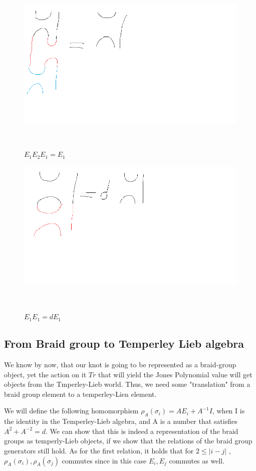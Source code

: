\documentclass{article}
\begin{document}
\begin{figure}
\includegraphics[scale=0.5]{tempely_lieb_second_rule} 
\caption{$E_{1}E_{2}E_{1}=E_{1}$}\
\end{figure}

\begin{figure}
\includegraphics[scale=0.5]{tempely_lieb_third_rule} 
\caption{$E_{1}E_{1}=dE_{1}$}\
\end{figure}

\subsection{From Braid group to Temperley Lieb algebra}
We know by now, that our knot is going to be represented as a braid-group object, yet the action on it $Tr$ that will yield the Jones Polynomial value will get objects from the Tmperley-Lieb world. Thus, we need some "translation" from a braid group element to a temperley-Lien element. 

We will define the following homomorphism
$\rho_{A}(\sigma_{i}) = AE_{i} +A^{-1}I$, when I is the identity in the Temperley-Lieb algebra,
and A is a number that satisfies $A^{2}+A^{-2}=d$.
We can show that this is indeed a representation of the braid groups as temperly-Lieb objects, if we show that the relations
of the braid group generators still hold.
As for the first relation, it holds that for $2 \leq |i-j|$ , $\rho_{A}(\sigma_{i}),\rho_{A}(\sigma_{j})$ commutes since in this case $E_{i},E_{j}$ commutes as well.
\end{document}
